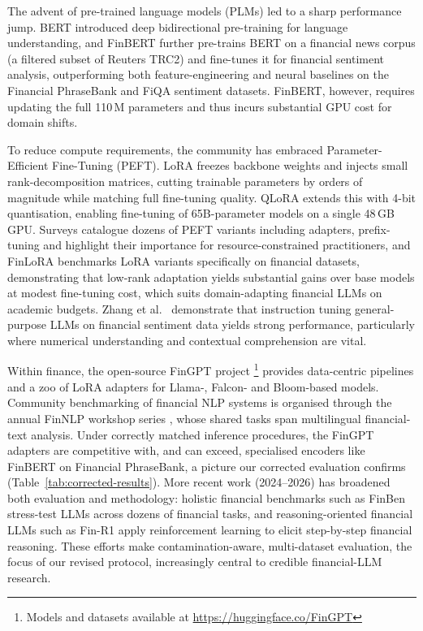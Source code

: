 \documentclass[a4paper]{article}
\begin{document}
The advent of pre-trained language models (PLMs) led to a sharp performance jump. BERT \cite{devlin2019} introduced deep bidirectional pre-training for language understanding, and FinBERT \cite{araci2019} further pre-trains BERT on a financial news corpus (a filtered subset of Reuters TRC2) and fine-tunes it for financial sentiment analysis, outperforming both feature-engineering and neural baselines on the Financial PhraseBank and FiQA sentiment datasets. FinBERT, however, requires updating the full 110\,M parameters and thus incurs substantial GPU cost for domain shifts.

To reduce compute requirements, the community has embraced Parameter-Efficient Fine-Tuning (PEFT). LoRA \cite{hu2022} freezes backbone weights and injects small rank-decomposition matrices, cutting trainable parameters by orders of magnitude while matching full fine-tuning quality. QLoRA \cite{dettmers2023} extends this with 4-bit quantisation, enabling fine-tuning of 65B-parameter models on a single 48\,GB GPU. Surveys \cite{peftsurvey2024} catalogue dozens of PEFT variants including adapters, prefix-tuning and highlight their importance for resource-constrained practitioners, and FinLoRA \cite{wang2025finlora} benchmarks LoRA variants specifically on financial datasets, demonstrating that low-rank adaptation yields substantial gains over base models at modest fine-tuning cost, which suits domain-adapting financial LLMs on academic budgets. Zhang et al.\ \cite{zhang2023instruct} demonstrate that instruction tuning general-purpose LLMs on financial sentiment data yields strong performance, particularly where numerical understanding and contextual comprehension are vital.

Within finance, the open-source FinGPT project \cite{yang2023}\footnote{Models and datasets available at \url{https://huggingface.co/FinGPT}} provides data-centric pipelines and a zoo of LoRA adapters for Llama-, Falcon- and Bloom-based models. Community benchmarking of financial NLP systems is organised through the annual FinNLP workshop series \cite{finnlp2023}, whose shared tasks span multilingual financial-text analysis. Under correctly matched inference procedures, the FinGPT adapters are competitive with, and can exceed, specialised encoders like FinBERT on Financial PhraseBank, a picture our corrected evaluation confirms (Table~\ref{tab:corrected-results}). More recent work (2024--2026) has broadened both evaluation and methodology: holistic financial benchmarks such as FinBen \cite{xie2024finben} stress-test LLMs across dozens of financial tasks, and reasoning-oriented financial LLMs such as Fin-R1 \cite{liu2025finr1} apply reinforcement learning to elicit step-by-step financial reasoning. These efforts make contamination-aware, multi-dataset evaluation, the focus of our revised protocol, increasingly central to credible financial-LLM research.
\end{document}
